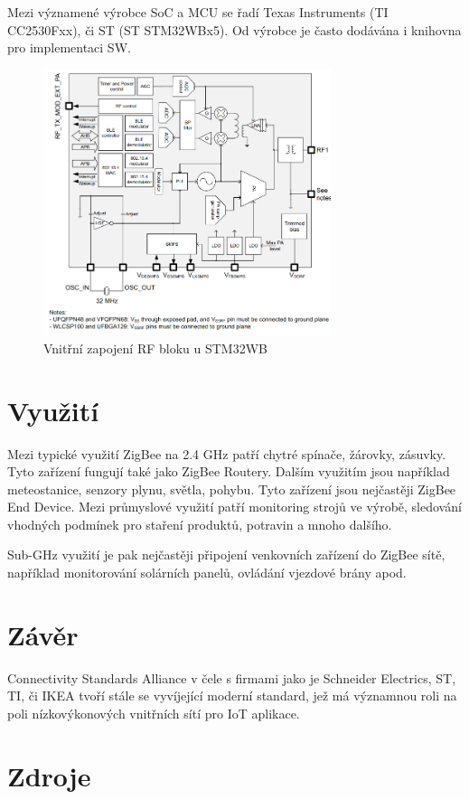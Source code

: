 \documentclass[a4paper,10pt,titlepage]{article}
\begin{document}
Mezi významené výrobce SoC a MCU se řadí Texas Instruments (TI CC2530Fxx), či ST (ST STM32WBx5). Od výrobce je často dodávána i knihovna pro implementaci SW.

\begin{figure}[H] \label{fig:rf-int}
	\centering
	\includegraphics[width=0.75\textwidth]{assets/rf_inner.png}
	\caption[Vnitřní zapojení RF bloku u STM32WB]{Vnitřní zapojení RF bloku u STM32WB~\cite{stm32wb}}
\end{figure}

\section{Využití}
Mezi typické využití ZigBee na 2.4 GHz patří chytré spínače, žárovky, zásuvky. Tyto zařízení fungují také jako ZigBee Routery. Dalším využitím jsou například meteostanice, senzory plynu, světla, pohybu. Tyto zařízení jsou nejčastěji ZigBee End Device. Mezi průmyslové využití patří monitoring strojů ve výrobě, sledování vhodných podmínek pro staření produktů, potravin a mnoho dalšího.

Sub-GHz využití je pak nejčastěji připojení venkovních zařízení do ZigBee sítě, například monitorování solárních panelů, ovládání vjezdové brány apod.

\section{Závěr}
Connectivity Standards Alliance v čele s firmami jako je Schneider Electrics, ST, TI, či IKEA tvoří stále se vyvíjející moderní standard, jež má významnou roli na poli nízkovýkonových vnitřních sítí pro IoT aplikace.

\section{Zdroje}
\nocite{*}
\printbibliography[heading=none]
\end{document}
